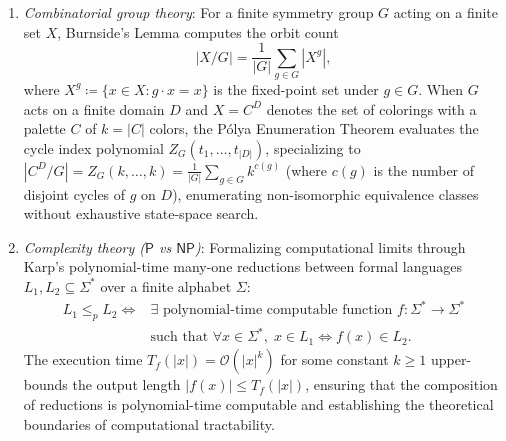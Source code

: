 \documentclass[10pt, letterpaper]{article}
\begin{document}
\begin{enumerate}
	\begin{equation}\label{eq:kasai_invariant}
		h[i+1] \ge h[i] - 1,
	\end{equation}
	bounding the cumulative character comparison increments across all iterations by at most $2n$.
    \item \textit{Combinatorial group theory}: For a finite symmetry group $G$ acting on a finite set $X$, Burnside's Lemma computes the orbit count
	\begin{equation}\label{eq:burnside_formula}
		|X/G| = \frac{1}{|G|}\sum_{g \in G} |X^g|,
	\end{equation}
	where $X^g \coloneqq \{x \in X : g \cdot x = x\}$ is the fixed-point set under $g \in G$. When $G$ acts on a finite domain $D$ and $X = C^D$ denotes the set of colorings with a palette $C$ of $k = |C|$ colors, the P\'olya Enumeration Theorem evaluates the cycle index polynomial $Z_G(t_1, \dots, t_{|D|})$, specializing to $|C^D/G| = Z_G(k, \dots, k) = \frac{1}{|G|}\sum_{g \in G} k^{c(g)}$ (where $c(g)$ is the number of disjoint cycles of $g$ on $D$), enumerating non-isomorphic equivalence classes without exhaustive state-space search.
    \item \textit{Complexity theory ($\mathsf{P}$ vs $\mathsf{NP}$)}: Formalizing computational limits through Karp's polynomial-time many-one reductions between formal languages $L_1, L_2 \subseteq \Sigma^*$ over a finite alphabet $\Sigma$:
	\begin{equation}\label{eq:karp_reduction}
		\begin{aligned}
			L_1 \le_p L_2 \iff {} & \exists \text{ polynomial-time computable function } f: \Sigma^* \to \Sigma^* \\
			& \text{such that } \forall x \in \Sigma^*, \; x \in L_1 \iff f(x) \in L_2.
		\end{aligned}
	\end{equation}
	The execution time $T_f(|x|) = \mathcal{O}(|x|^k)$ for some constant $k \ge 1$ upper-bounds the output length $|f(x)| \le T_f(|x|)$, ensuring that the composition of reductions is polynomial-time computable and establishing the theoretical boundaries of computational tractability.
\end{enumerate}
\end{document}

